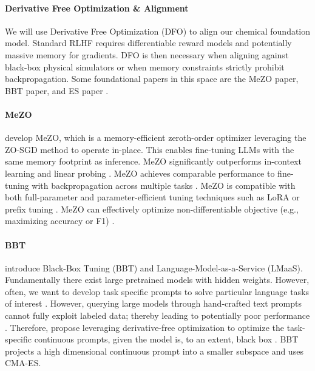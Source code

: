 \documentclass[10pt]{article}
\begin{document}
\paragraph{Derivative Free Optimization \& Alignment}
We will use Derivative Free Optimization (DFO) to align our chemical foundation model. Standard RLHF requires differentiable reward models and potentially massive memory for gradients. DFO is then necessary when aligning against black-box physical simulators or when memory constraints strictly prohibit backpropagation. Some foundational papers in this space are the MeZO paper, BBT paper, and ES paper \citep{malladi2023finetuning, sun2022bbt, salimans2017evolutionstrategiesscalablealternative}.

\paragraph{MeZO} \citet{malladi2023finetuning} develop MeZO, which is a memory-efficient zeroth-order optimizer leveraging the ZO-SGD method to operate in-place. This enables fine-tuning LLMs with the same memory footprint as inference. MeZO significantly outperforms in-context learning and linear probing \citep{malladi2023finetuning}. MeZO achieves comparable performance to fine-tuning with backpropagation across multiple tasks \citep{malladi2023finetuning}. MeZO is compatible with both full-parameter and parameter-efficient tuning techniques such as LoRA or prefix tuning \citep{malladi2023finetuning}. MeZO can effectively optimize non-differentiable objective (e.g., maximizing accuracy or F1) \citep{malladi2023finetuning}.

\paragraph{BBT} \citet{sun2022bbt} introduce Black-Box Tuning (BBT) and Language-Model-as-a-Service (LMaaS). Fundamentally there exist large pretrained models with hidden weights. However, often, we want to develop task specific prompts to solve particular language tasks of interest \citep{sun2022bbt}. However, querying large models through hand-crafted text prompts cannot fully exploit labeled data; thereby leading to potentially poor performance \citep{sun2022bbt}. Therefore, \citet{sun2022bbt} propose leveraging derivative-free optimization to optimize the task-specific continuous prompts, given the model is, to an extent, black box \citep{sun2022bbt}. BBT projects a high dimensional continuous prompt into a smaller subspace and uses CMA-ES.
\end{document}
